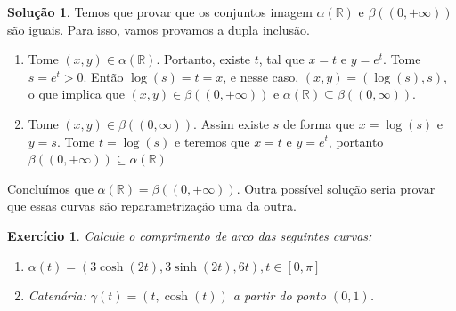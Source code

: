 \documentclass[a4paper,12pt]{article}
\newcommand{\R}{\mathbb{R}}
\theoremstyle{exer}
\newtheorem{exercise}{Exercício}
\theoremstyle{definition}
\newtheorem{solution}{Solução}
\theoremstyle{plain}
\begin{document}
\begin{solution}
    Temos que provar que os conjuntos imagem $\alpha(\R)$ e
    $\beta((0,+\infty))$ são iguais. Para isso, vamos provamos a dupla
    inclusão. 

    \begin{enumerate}
        \item Tome $(x,y) \in \alpha(\R)$. Portanto, existe $t$, tal que $x =
        t$ e $y = e^t$. Tome $s = e^t > 0$. Então $\log(s) = t = x$, e nesse
        caso, $(x,y) = (\log(s), s)$, o que implica que $(x,y) \in
        \beta((0,+\infty))$ e $\alpha(\R) \subseteq \beta((0,\infty))$. 
        
        \item Tome $(x,y) \in \beta((0,\infty))$. Assim existe $s$ de forma
        que $x = \log(s)$ e $y = s$. Tome $t = \log(s)$ e teremos que $x = t$
        e $y = e^t$, portanto $\beta((0,+\infty)) \subseteq \alpha(\R)$
    \end{enumerate}
    Concluímos que $\alpha(\R) = \beta((0,+\infty))$. Outra possível solução
    seria provar que essas curvas são reparametrização uma da outra. 
\end{solution}

\begin{exercise}
    Calcule o comprimento de arco das seguintes curvas:
    \begin{enumerate}
        \item $\alpha(t) = (3\cosh(2t), 3\sinh(2t),6t), t \in [0, \pi]$
        \item Catenária: $\gamma(t) = (t,\cosh(t))$ a partir do ponto $(0,1)$.
    \end{enumerate}
\end{exercise}
\end{document}
